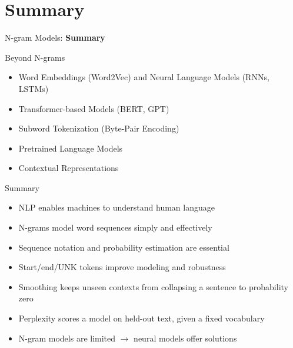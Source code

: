\section{Summary}
\begin{frame}{}
    \LARGE N-gram Models: \textbf{Summary}
\end{frame}

\begin{frame}{Beyond N-grams}
    \begin{itemize}
        \item Word Embeddings (Word2Vec) and Neural Language Models (RNNs, LSTMs)
        \item Transformer-based Models (BERT, GPT)
        \item Subword Tokenization (Byte-Pair Encoding)
        \item Pretrained Language Models
        \item Contextual Representations
    \end{itemize}
\end{frame}

\begin{frame}{Summary}
    \begin{itemize}
        \item NLP enables machines to understand human language
        \item N-grams model word sequences simply and effectively
        \item Sequence notation and probability estimation are essential
        \item Start/end/UNK tokens improve modeling and robustness
        \item Smoothing keeps unseen contexts from collapsing a sentence to probability zero
        \item Perplexity scores a model on held-out text, given a fixed vocabulary
        \item N-gram models are limited $\rightarrow$ neural models offer solutions
    \end{itemize}
\end{frame}